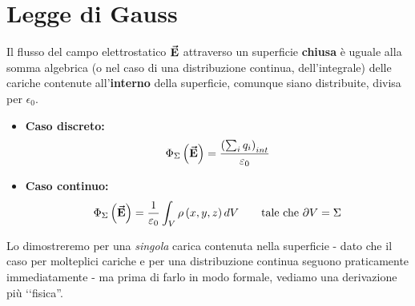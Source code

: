 \section{Legge di Gauss}
\begin{theorema}
	Il flusso del campo elettrostatico $\vb*{\va{E}}$ attraverso un superficie \textbf{chiusa} è uguale alla somma algebrica (\textrm{o nel caso di una distribuzione continua}, dell'integrale) delle cariche contenute all'\textbf{interno} della superficie, comunque siano distribuite, divisa per $\epsilon_0$.
	\begin{itemize}
		\item \textbf{Caso discreto:}
		\begin{equation}
			\Phi_\Sigma\left(\vb*{\va{E}}\right)=\frac{\left(\sum_i q_i\right)_{int}}{\varepsilon_0}\label{LeggeGaussDiscreta}
		\end{equation}
		\item \textbf{Caso continuo:}
		\begin{equation}
			\Phi_\Sigma\left(\vb*{\va{E}}\right)=\frac{1}{\varepsilon_0}\int_{V}\rho\left(x,y,z\right)dV\qquad\text{tale che}\ \partial V=\Sigma\label{LeggeGaussContinua}
		\end{equation}
	\end{itemize}
\end{theorema}
Lo dimostreremo per una \textit{singola} carica contenuta nella superficie - dato che il caso per molteplici cariche e per una distribuzione continua seguono praticamente immediatamente - ma prima di farlo in modo formale, vediamo una derivazione più ‘‘fisica''.
